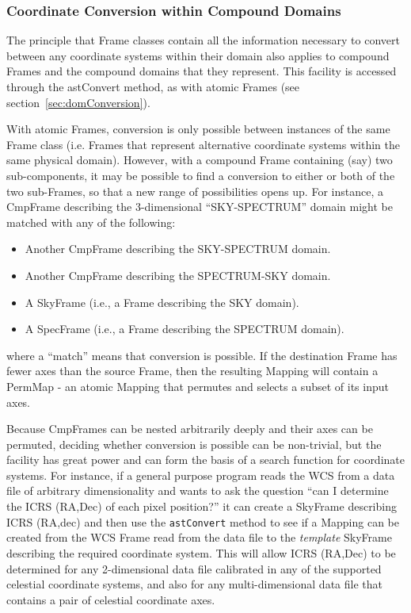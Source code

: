 \documentclass[final,authoryear,5p,times,twocolumn]{elsarticle}
\begin{document}
\subsubsection{Coordinate Conversion within Compound Domains}
The principle that Frame classes contain all the information necessary to
convert between any coordinate systems within their domain also applies
to compound Frames and the compound domains that they represent. This
facility is accessed through the astConvert method, as with atomic Frames
(see section~\ref{sec:domConversion}).

With atomic Frames, conversion is only possible between instances of the
same Frame class (i.e. Frames that represent alternative coordinate
systems within the same physical domain). However, with a compound Frame
containing (say) two sub-components, it may be possible to find a
conversion to either or both of the two sub-Frames, so that a new range
of possibilities opens up. For instance, a CmpFrame describing the
3-dimensional ``SKY-SPECTRUM'' domain might be matched with any of the
following:

\begin{itemize}
\item Another CmpFrame describing the SKY-SPECTRUM domain.
\item Another CmpFrame describing the SPECTRUM-SKY domain.
\item A SkyFrame (i.e., a Frame describing the SKY domain).
\item A SpecFrame (i.e., a Frame describing the SPECTRUM domain).
\end{itemize}

where a ``match'' means that conversion is possible. If the destination
Frame has fewer axes than the source Frame, then the resulting Mapping
will contain a PermMap - an atomic Mapping that permutes and selects a
subset of its input axes.

Because CmpFrames can be nested arbitrarily deeply and their axes can be
permuted, deciding whether conversion is possible can be non-trivial, but
the facility has great power and can form the basis of a search function
for coordinate systems. For instance, if a general purpose program reads
the WCS from a data file of arbitrary dimensionality and wants to ask the
question ``can I determine the ICRS (RA,Dec) of each pixel position?'' it
can create a SkyFrame describing ICRS (RA,dec) and then use the
\texttt{astConvert} method to see if a Mapping can be created from the
WCS Frame read from the data file to the \emph{template} SkyFrame
describing the required coordinate system. This will allow ICRS (RA,Dec)
to be determined for any 2-dimensional data file calibrated in any of the
supported celestial coordinate systems, and also for any multi-dimensional data
file that contains a pair of celestial coordinate axes.
\end{document}
